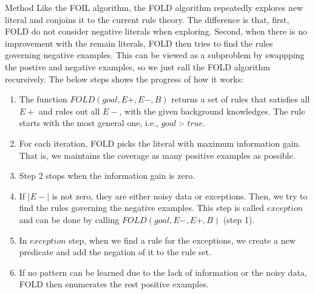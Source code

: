 \documentclass[12pt,a4paper]{article}
\begin{document}
	\begin{section}{Method}
		Like the FOIL algorithm, the FOLD algorithm repeatedly explores new literal and conjoins it to the current rule theory. The difference is that, first, FOLD do not consider negative literals when exploring. Second, when there is no improvement with the remain literals, FOLD then tries to find the rules governing negative examples. This can be viewed as a subproblem by swappping the postive and negative examples, so we just call the FOLD algorithm recursively. The below steps shows the progress of how it works:
		\begin{enumerate}
			\item {
				The function $FOLD(goal,E+,E-,B)$ returns a set of rules that satisfies all $E+$ and rules out all $E-$, with the given background knowledges. The rule starts with the most general one, i.e., $goal$ :- $true.$

			}
			\item {
				For each iteration, FOLD picks the literal with maximum information gain. That is, we maintains the coverage as many positive examples as possible.
			}
			\item {
				Step 2 stops when the information gain is zero.
			}
			\item {
				If $|E-|$ is not zero, they are either noisy data or exceptions. Then, we try to find the rules governing the negative examples. This step is called $exception$ and can be done by calling $FOLD(goal, E-,E+,B)$ (step 1).
			}
			\item {
				In $exception$ step, when we find a rule for the exceptions, we create a new predicate and add the negation of it to the rule set.
			}
			\item {
				If no pattern can be learned due to the lack of information or the noisy data, FOLD then enumerates the rest positive examples.
			}
		\end{enumerate}
	\end{section}
\end{document}
